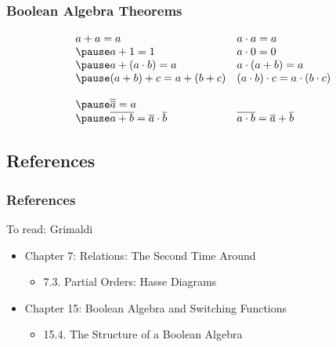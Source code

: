 \documentclass[dvipsnames]{beamer}
\begin{document}
\begin{frame}
  \frametitle{Boolean Algebra Theorems}

    \[\begin{array}{ll}
      a + a = a &
      a \cdot a = a\\ \pause
      a + 1 = 1 &
      a \cdot 0 = 0\\ \pause
      a + (a \cdot b) = a &
      a \cdot (a + b) = a\\ \pause
      (a + b) + c = a + (b + c) &
      (a \cdot b) \cdot c = a \cdot (b \cdot c)\bigskip\\ \pause
      \overline{\overline{a}} = a & \\ \pause
      \overline{a + b} = \overline{a} \cdot \overline{b} &
      \overline{a \cdot b} = \overline{a} + \overline{b}
    \end{array}\]
\end{frame}

\subsection*{References}

\begin{frame}
  \frametitle{References}

  \begin{block}{To read: Grimaldi}
    \begin{itemize}
      \item Chapter 7: Relations: The Second Time Around
      \begin{itemize}
        \item 7.3. \alert{Partial Orders: Hasse Diagrams}
      \end{itemize}

      \item Chapter 15: Boolean Algebra and Switching Functions
      \begin{itemize}
        \item 15.4. \alert{The Structure of a Boolean Algebra}
      \end{itemize}
    \end{itemize}
  \end{block}
\end{frame}
\end{document}

